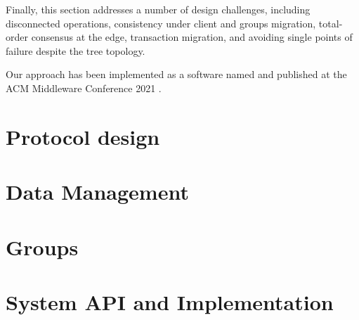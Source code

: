 Finally, this section addresses a number of design challenges, including disconnected operations, consistency under client and groups migration, total-order consensus at the edge, transaction migration, and avoiding single points of failure despite the tree topology.

Our approach has been implemented as a software named \system{} \cite{IlyasTou91:online} and
published at the ACM Middleware Conference 2021 \cite{toumlilt:hal-03353663}.

\chapter{Protocol design}
\label{ch:protocol-design}


\chapter{Data Management}
\label{ch:data-management}


\chapter{Groups}
\label{ch:groups}


\chapter{System API and Implementation}
\label{ch:implementation}

